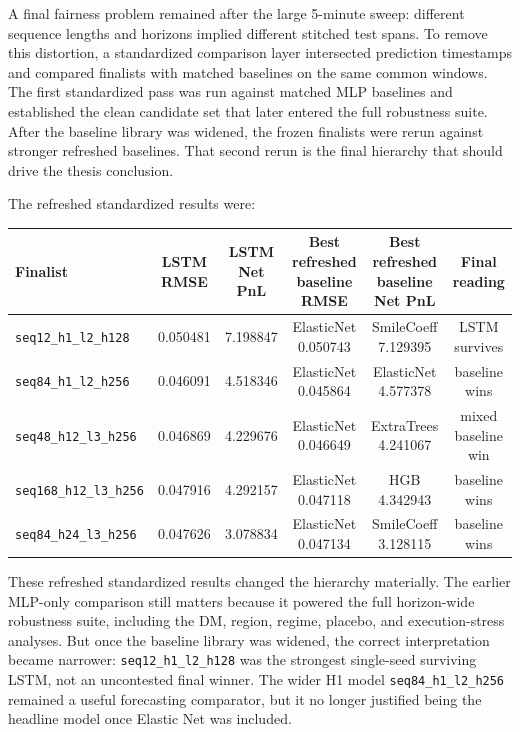 \documentclass[12pt]{report}
\begin{document}
A final fairness problem remained after the large 5-minute sweep: different sequence lengths and horizons implied different stitched test spans. To remove this distortion, a standardized comparison layer intersected prediction timestamps and compared finalists with matched baselines on the same common windows. The first standardized pass was run against matched MLP baselines and established the clean candidate set that later entered the full robustness suite. After the baseline library was widened, the frozen finalists were rerun against stronger refreshed baselines. That second rerun is the final hierarchy that should drive the thesis conclusion.

The refreshed standardized results were:
\begin{center}
\begin{tabular}{lccccc}
\toprule
Finalist & LSTM RMSE & LSTM Net PnL & Best refreshed baseline RMSE & Best refreshed baseline Net PnL & Final reading \\
\midrule
\texttt{seq12\_h1\_l2\_h128} & 0.050481 & 7.198847 & ElasticNet 0.050743 & SmileCoeff 7.129395 & LSTM survives \\
\texttt{seq84\_h1\_l2\_h256} & 0.046091 & 4.518346 & ElasticNet 0.045864 & ElasticNet 4.577378 & baseline wins \\
\texttt{seq48\_h12\_l3\_h256} & 0.046869 & 4.229676 & ElasticNet 0.046649 & ExtraTrees 4.241067 & mixed baseline win \\
\texttt{seq168\_h12\_l3\_h256} & 0.047916 & 4.292157 & ElasticNet 0.047118 & HGB 4.342943 & baseline wins \\
\texttt{seq84\_h24\_l3\_h256} & 0.047626 & 3.078834 & ElasticNet 0.047134 & SmileCoeff 3.128115 & baseline wins \\
\bottomrule
\end{tabular}
\end{center}

These refreshed standardized results changed the hierarchy materially. The earlier MLP-only comparison still matters because it powered the full horizon-wide robustness suite, including the DM, region, regime, placebo, and execution-stress analyses. But once the baseline library was widened, the correct interpretation became narrower: \texttt{seq12\_h1\_l2\_h128} was the strongest single-seed surviving LSTM, not an uncontested final winner. The wider H1 model \texttt{seq84\_h1\_l2\_h256} remained a useful forecasting comparator, but it no longer justified being the headline model once Elastic Net was included.
\end{document}
